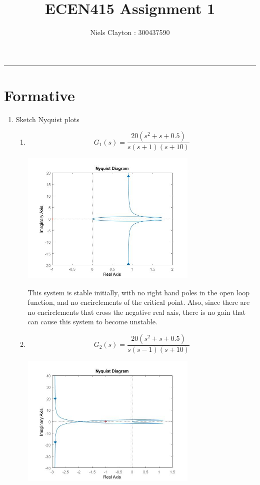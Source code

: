 \documentclass[a4paper,11pt]{article}
\begin{document}
\begin{preview}
\title{\LARGE{\textbf{ECEN415 Assignment 1}}}
\author{Niels Clayton : 300437590}
\date{}
\maketitle
\hrule

\section*{Formative}

\begin{enumerate}
    
    \item Sketch Nyquist plots

    \begin{enumerate}
      \item $$ G_1 (s) = \frac{20(s^2+s+0.5)}{s(s+1)(s+10)} $$
      
      \begin{center}
        \includegraphics[width=0.7\textwidth]{A_1/1_a.jpg}
      \end{center}

      This system is stable initially, with no right hand poles in the open loop function, and no encirclements of the critical point. Also, since there are no encirclements  that cross the negative real axis, there is no gain that can cause this system to become unstable.\\
      

      \item $$ G_2 (s) = \frac{20(s^2+s+0.5)}{s(s-1)(s+10)} $$

      \begin{center}
        \includegraphics[width=0.7\textwidth]{A_1/1_b.jpg}
      \end{center}


\end{enumerate}
\end{enumerate}
\end{preview}
\end{document}
